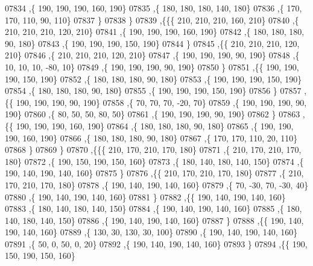 \begin{DoxyCode}
07834     ,\{   190,   190,   190,   160,   190\}
07835     ,\{   180,   180,   180,   140,   180\}
07836     ,\{   170,   170,   110,    90,   110\}
07837     \}
07838    \}
07839   ,\{\{\{   210,   210,   210,   160,   210\}
07840     ,\{   210,   210,   210,   120,   210\}
07841     ,\{   190,   190,   190,   160,   190\}
07842     ,\{   180,   180,   180,    90,   180\}
07843     ,\{   190,   190,   190,   150,   190\}
07844     \}
07845    ,\{\{   210,   210,   210,   120,   210\}
07846     ,\{   210,   210,   210,   120,   210\}
07847     ,\{   190,   190,   190,    90,   190\}
07848     ,\{    10,    10,    10,   -80,    10\}
07849     ,\{   190,   190,   190,    90,   190\}
07850     \}
07851    ,\{\{   190,   190,   190,   150,   190\}
07852     ,\{   180,   180,   180,    90,   180\}
07853     ,\{   190,   190,   190,   150,   190\}
07854     ,\{   180,   180,   180,    90,   180\}
07855     ,\{   190,   190,   190,   150,   190\}
07856     \}
07857    ,\{\{   190,   190,   190,    90,   190\}
07858     ,\{    70,    70,    70,   -20,    70\}
07859     ,\{   190,   190,   190,    90,   190\}
07860     ,\{    80,    50,    50,    80,    50\}
07861     ,\{   190,   190,   190,    90,   190\}
07862     \}
07863    ,\{\{   190,   190,   190,   160,   190\}
07864     ,\{   180,   180,   180,    90,   180\}
07865     ,\{   190,   190,   190,   160,   190\}
07866     ,\{   180,   180,   180,    90,   180\}
07867     ,\{   170,   170,   110,    20,   110\}
07868     \}
07869    \}
07870   ,\{\{\{   210,   170,   210,   170,   180\}
07871     ,\{   210,   170,   210,   170,   180\}
07872     ,\{   190,   150,   190,   150,   160\}
07873     ,\{   180,   140,   180,   140,   150\}
07874     ,\{   190,   140,   190,   140,   160\}
07875     \}
07876    ,\{\{   210,   170,   210,   170,   180\}
07877     ,\{   210,   170,   210,   170,   180\}
07878     ,\{   190,   140,   190,   140,   160\}
07879     ,\{    70,   -30,    70,   -30,    40\}
07880     ,\{   190,   140,   190,   140,   160\}
07881     \}
07882    ,\{\{   190,   140,   190,   140,   160\}
07883     ,\{   180,   140,   180,   140,   150\}
07884     ,\{   190,   140,   190,   140,   160\}
07885     ,\{   180,   140,   180,   140,   150\}
07886     ,\{   190,   140,   190,   140,   160\}
07887     \}
07888    ,\{\{   190,   140,   190,   140,   160\}
07889     ,\{   130,    30,   130,    30,   100\}
07890     ,\{   190,   140,   190,   140,   160\}
07891     ,\{    50,     0,    50,     0,    20\}
07892     ,\{   190,   140,   190,   140,   160\}
07893     \}
07894    ,\{\{   190,   150,   190,   150,   160\}

\end{DoxyCode}
